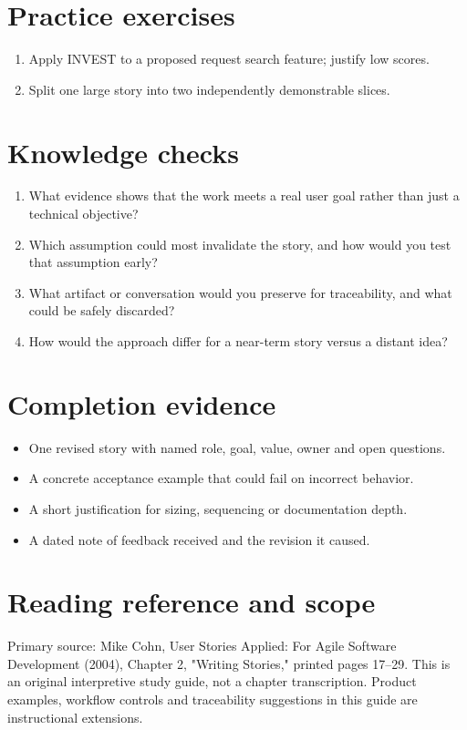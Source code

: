 \documentclass[11pt,letterpaper]{article}
\begin{document}
\section{Practice exercises}
\begin{enumerate}[leftmargin=*,itemsep=3pt]
\item Apply INVEST to a proposed request search feature; justify low scores.
\item Split one large story into two independently demonstrable slices.
\end{enumerate}
\section{Knowledge checks}
\begin{enumerate}[leftmargin=*,itemsep=3pt]
\item What evidence shows that the work meets a real user goal rather than just a technical objective?
\item Which assumption could most invalidate the story, and how would you test that assumption early?
\item What artifact or conversation would you preserve for traceability, and what could be safely discarded?
\item How would the approach differ for a near-term story versus a distant idea?
\end{enumerate}
\section{Completion evidence}
\begin{itemize}[leftmargin=*,itemsep=2pt]
\item One revised story with named role, goal, value, owner and open questions.
\item A concrete acceptance example that could fail on incorrect behavior.
\item A short justification for sizing, sequencing or documentation depth.
\item A dated note of feedback received and the revision it caused.
\end{itemize}
\section{Reading reference and scope}
Primary source: Mike Cohn, User Stories Applied: For Agile Software Development (2004), Chapter 2, "Writing Stories," printed pages 17–29. This is an original interpretive study guide, not a chapter transcription. Product examples, workflow controls and traceability suggestions in this guide are instructional extensions.
\end{document}
